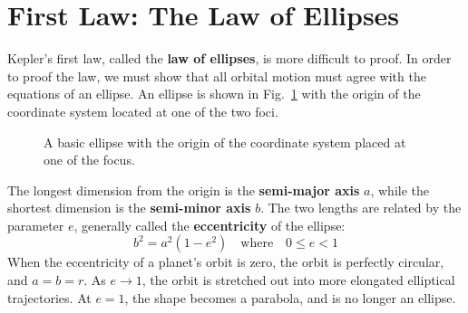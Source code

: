 \documentclass{../../../oss-handout}
\begin{document}
\section{First Law: The Law of Ellipses}
Kepler's first law, called the \textbf{law of ellipses}, is more difficult to
proof. In order to proof the
law, we must show that all orbital motion must agree with the equations of an
ellipse. An ellipse is shown in Fig.~\ref{ellipse1} with the origin of the
coordinate system located at one of the two foci.
\begin{figure}[!ht]
  \centering
  \caption{A basic ellipse with the origin of the coordinate system placed at
    one of the focus.}
  \label{ellipse1}
\end{figure}

The longest dimension from the origin is the \textbf{semi-major axis} $a$, while
the shortest dimension is the \textbf{semi-minor axis} $b$. The two lengths are
related by the parameter $e$, generally called the \textbf{eccentricity} of the
ellipse:
\begin{equation}
  b^2=a^2(1-e^2)\quad\text{where}\quad 0\leq e < 1
\end{equation}
When the eccentricity of a planet's orbit is zero, the orbit is perfectly
circular, and $a=b=r$. As $e\rightarrow 1$, the orbit is stretched out into
more elongated elliptical trajectories.
At $e=1$, the shape becomes a parabola, and is no longer an ellipse.
\end{document}
